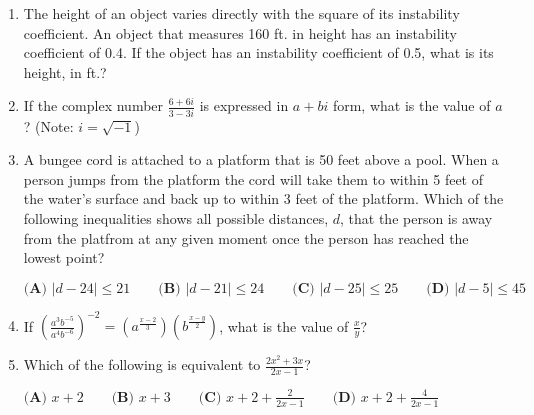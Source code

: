 \documentclass[../satmath.tex]{subfiles}
\begin{document}
\begin{enumerate}[label=\bfseries\arabic*.]
\item The height of an object varies directly with the square of its instability coefficient. An object that measures 160 ft. in height has an 
instability coefficient of 0.4. If the object has an instability coefficient of 0.5, what is its height, in ft.?

\item If the complex number $\frac{6+6i}{3-3i}$ is expressed in $a+bi$ form, what is the value of $a$? (Note: $i=\sqrt{-1}$)
 
\item A bungee cord is attached to a platform that is 50 feet above a pool. When a person jumps from the platform the cord will take them to within 
5 feet of the water's surface and back up to within 3 feet of the platform. Which of the following inequalities shows all possible distances, $d$, 
that the person is away from the platfrom at any given moment once the person has reached the lowest point?

$\textbf{(A) } |d-24|\leq 21 \qquad \textbf{(B) } |d-21|\leq 24 \qquad \textbf{(C) } |d-25|\leq 25 \qquad \textbf{(D) } |d-5|\leq 45$
 
\item If $\left(\frac{a^3b^{-5}}{a^4b^{-6}}\right)^{-2}=\left(a^{\frac{x-2}{3}}\right)\left(b^{\frac{x-y}{2}}\right)$, what is the value of $\frac{x}{y}$?

\item Which of the following is equivalent to $\frac{2x^2+3x}{2x-1}$?

$\textbf{(A) } x+2 \qquad \textbf{(B) } x+3 \qquad \textbf{(C) } x+2+\frac{2}{2x-1} \qquad \textbf{(D) } x+2+\frac{4}{2x-1}$

\end{enumerate}
 
\end{document}

